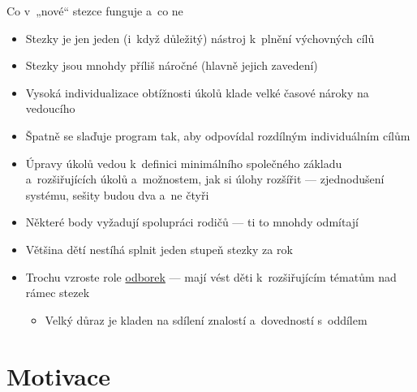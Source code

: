 \documentclass[compress, ucs, xelatex, xcolor=dvipsnames, print,
  hyperref={
    bookmarks=true,
    unicode=true,
    colorlinks=true,
    plainpages=false,
    pdfkeywords={Junak, Pedagogika, Skaut, Skauting, Vychovna metoda},
    linkcolor=Black,
    anchorcolor=Black,
    citecolor=OliveGreen,
    filecolor=OliveGreen,
    menucolor=Black,
    urlcolor=OliveGreen,
    pdftex}
  ]{beamer}
\begin{document}
\begin{frame}{Co v~„nové“ stezce funguje a~co ne}
  \begin{itemize}
    \item Stezky je jen jeden (i~když důležitý) nástroj k~plnění výchovných cílů
    \item Stezky jsou mnohdy příliš náročné (hlavně jejich zavedení)
    \item Vysoká individualizace obtížnosti úkolů klade velké časové nároky na vedoucího
    \item Špatně se slaďuje program tak, aby odpovídal rozdílným individuálním cílům
    \item Úpravy úkolů vedou k~definici minimálního společného základu a~rozšiřujících úkolů a~možnostem, jak si úlohy rozšířit --- zjednodušení systému, sešity budou dva a~ne čtyři
    \item Některé body vyžadují spolupráci rodičů --- ti to mnohdy odmítají
    \item Většina dětí nestíhá splnit jeden stupeň stezky za rok
    \item Trochu vzroste role \href{https://odborky.skaut.cz/}{odborek} --- mají vést děti k~rozšiřujícím tématům nad rámec stezek
    \begin{itemize}
      \item Velký důraz je kladen na sdílení znalostí a~dovedností s~oddílem
    \end{itemize}
  \end{itemize}
\end{frame}

\section{Motivace}
\end{document}
